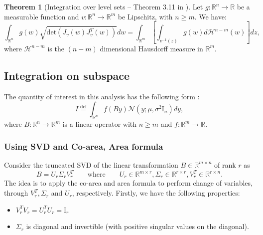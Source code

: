 \documentclass[a4paper,10pt]{article}
\theoremstyle{definition} %
\theoremstyle{definition} %
\theoremstyle{definition} %
\newtheorem{theorem}[definition]{Theorem}
\theoremstyle{definition} %
\newcommand{\R}{\mathbb{R}}
\newcommand{\Normal}[1]{\mathcal{N}\left( {#1} \right)}
\newcommand{\Id}{\mathrm{I}}
\newcommand{\0}{\boldsymbol{0}}
\renewcommand{\H}{\mathcal{H}}
\renewcommand{\det}[1]{\mathrm{det}\left( #1 \right)}
\newcommand{\eqdef}{\stackrel{\mathrm{def}}{=}}
\begin{document}
\begin{theorem}[Integration over level sets -- Theorem 3.11 in \cite{evans2018measure}]
    \label{theorem:coarea}
    Let $g: \R^n \to \R$ be a measurable function and $v: \R^n \to \R^m$ be Lipschitz, with $n \geqslant m$. We have: 
    \begin{equation*}
        \int_{\R^n} g(w) \sqrt{\det{J_v(w) J_v^T(w)}} dw = \int_{\R^m} \left[ \int_{v^{-1}(z)} g(w) d\H^{n - m}(w) \right] dz,
    \end{equation*}
    where $\H^{n - m}$ is the $(n - m)$ dimensional Hausdorff measure in $\R^m$. 
\end{theorem}

\subsection{Integration on subspace}
The quantity of interest in this analysis has the following form :
\begin{equation*}
    I \eqdef \int_{\R^n} f(B y) \Normal{y; \mu, \sigma^2 \Id_n} dy ,
\end{equation*}
where $B: \R^n \to \R^m$  is a linear operator with  $n \geqslant m$ and $f:\R^m \to \R$.
\subsubsection*{Using SVD and Co-area, Area formula}
Consider the truncated SVD of the linear transformation $B \in \R^{m \times n}$ of rank $r$ as 
\begin{equation*}
    B = U_r \Sigma_r V_r^T \qquad \mbox{where} \qquad U_r \in \R^{m \times r}, \Sigma_r \in \R^{r \times r}, V_r^T \in \R^{r \times n}.
\end{equation*}
The idea is to apply the co-area  and area formula  to perform change of variables, through $V_r^T, \Sigma_r$ and $U_r$, respectively.
Firstly, we have the following properties:
\begin{itemize}
    \item[] $V_r^T V_r = U_r^T U_r = \Id_r$
    \item[] $\Sigma_r$ is diagonal and invertible (with positive singular values on the diagonal).
\end{itemize}
\end{document}
